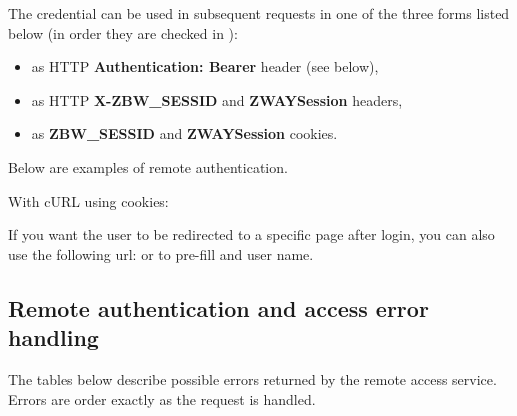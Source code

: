 The credential can be used in subsequent requests in one of the three forms listed below (in order they are checked in \zway):
\begin{itemize}
\item as HTTP \textbf{Authentication: Bearer} header (see below),
\item as HTTP \textbf{X-ZBW\_SESSID} and \textbf{ZWAYSession} headers,
\item as \textbf{ZBW\_SESSID} and \textbf{ZWAYSession} cookies.
\end{itemize}

Below are examples of remote authentication.

With cURL using cookies:
{\scriptsize
\begin{quote} 
\end{quote}
}


If you want the user to be redirected to a specific page after login, you can also use the following url:  or  to pre-fill \zwaydeviceid and user name.

\subsection{Remote authentication and access error handling}
\label{cap:authentication_remote_errors}

The tables below describe possible errors returned by the remote access service. Errors are order exactly as the request is handled.

